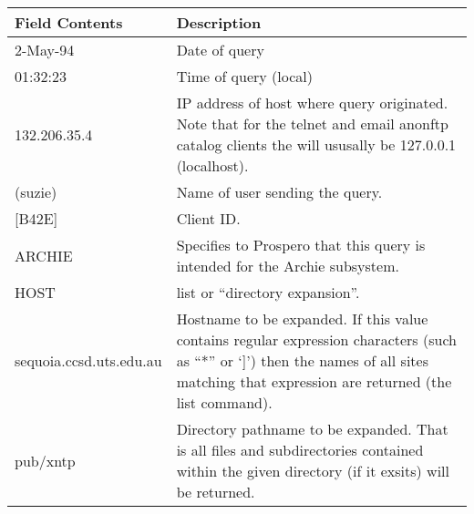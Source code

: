 \begin{center}
\begin{tabular}{|l|p{4in}|} \hline
Field Contents & Description \\ \hline\hline

2-May-94 & Date of query \\ \hline

01:32:23 & Time of query (local) \\ \hline

132.206.35.4 &
IP address of host where query originated. Note that for the telnet and email
anonftp catalog clients the will ususally be 127.0.0.1 (localhost). \\ \hline

(suzie) & Name of user sending the query. \\ \hline

[B42E] & Client ID. \\ \hline

ARCHIE & 
Specifies to Prospero that this query is intended for the Archie subsystem. \\ \hline

HOST & list or ``directory expansion''. \\ \hline

sequoia.ccsd.uts.edu.au & 
Hostname to be expanded. If this value contains regular expression characters
(such as ``*'' or `]') then the names of all sites matching that expression are
returned (the list command). \\ \hline

pub/xntp &
Directory pathname to be expanded. That is all files and subdirectories
contained within the given directory (if it exsits) will be returned. \\
\hline
\end{tabular}
\end{center}


